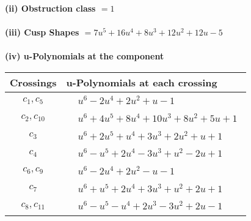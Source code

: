 \documentclass[1p]{elsarticle_modified}
\theoremstyle{definition}
\begin{document}
\flushleft \textbf{(ii) Obstruction class $= 1$}\\~\\
\flushleft \textbf{(iii) Cusp Shapes $= 7 u^5+16 u^4+8 u^3+12 u^2+12 u-5$}\\~\\
\newpage\renewcommand{\arraystretch}{1}
\flushleft \textbf{(iv) u-Polynomials at the component}\newline \\
\begin{tabular}{m{50pt}|m{274pt}}
Crossings & \hspace{64pt}u-Polynomials at each crossing \\
\hline $$\begin{aligned}c_{1},c_{5}\end{aligned}$$&$\begin{aligned}
&u^6-2 u^4+2 u^2+u-1
\end{aligned}$\\
\hline $$\begin{aligned}c_{2},c_{10}\end{aligned}$$&$\begin{aligned}
&u^6+4 u^5+8 u^4+10 u^3+8 u^2+5 u+1
\end{aligned}$\\
\hline $$\begin{aligned}c_{3}\end{aligned}$$&$\begin{aligned}
&u^6+2 u^5+u^4+3 u^3+2 u^2+u+1
\end{aligned}$\\
\hline $$\begin{aligned}c_{4}\end{aligned}$$&$\begin{aligned}
&u^6- u^5+2 u^4-3 u^3+u^2-2 u+1
\end{aligned}$\\
\hline $$\begin{aligned}c_{6},c_{9}\end{aligned}$$&$\begin{aligned}
&u^6-2 u^4+2 u^2- u-1
\end{aligned}$\\
\hline $$\begin{aligned}c_{7}\end{aligned}$$&$\begin{aligned}
&u^6+u^5+2 u^4+3 u^3+u^2+2 u+1
\end{aligned}$\\
\hline $$\begin{aligned}c_{8},c_{11}\end{aligned}$$&$\begin{aligned}
&u^6- u^5- u^4+2 u^3-3 u^2+2 u-1
\end{aligned}$\\
\hline
\end{tabular}\\~\\
\end{document}
